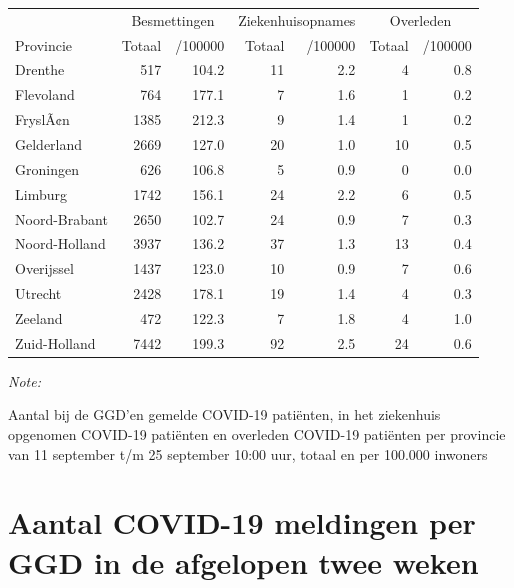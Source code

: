 \documentclass[
  english,
  man,floatsintext]{apa6}
\begin{document}
\begin{table}
\centering
\begin{threeparttable}
\begin{tabular}{lrrrrrr}
\toprule
\multicolumn{1}{c}{ } & \multicolumn{2}{c}{Besmettingen} & \multicolumn{2}{c}{Ziekenhuisopnames} & \multicolumn{2}{c}{Overleden} \\
\cmidrule(l{3pt}r{3pt}){2-3} \cmidrule(l{3pt}r{3pt}){4-5} \cmidrule(l{3pt}r{3pt}){6-7}
Provincie & Totaal & /100000 & Totaal & /100000 & Totaal & /100000\\
\midrule
Drenthe & 517 & 104.2 & 11 & 2.2 & 4 & 0.8\\
Flevoland & 764 & 177.1 & 7 & 1.6 & 1 & 0.2\\
FryslÃ¢n & 1385 & 212.3 & 9 & 1.4 & 1 & 0.2\\
Gelderland & 2669 & 127.0 & 20 & 1.0 & 10 & 0.5\\
Groningen & 626 & 106.8 & 5 & 0.9 & 0 & 0.0\\
Limburg & 1742 & 156.1 & 24 & 2.2 & 6 & 0.5\\
Noord-Brabant & 2650 & 102.7 & 24 & 0.9 & 7 & 0.3\\
Noord-Holland & 3937 & 136.2 & 37 & 1.3 & 13 & 0.4\\
Overijssel & 1437 & 123.0 & 10 & 0.9 & 7 & 0.6\\
Utrecht & 2428 & 178.1 & 19 & 1.4 & 4 & 0.3\\
Zeeland & 472 & 122.3 & 7 & 1.8 & 4 & 1.0\\
Zuid-Holland & 7442 & 199.3 & 92 & 2.5 & 24 & 0.6\\
\bottomrule
\end{tabular}
\begin{tablenotes}
\item \textit{Note: } 
\item Aantal bij de GGD’en gemelde COVID-19 patiënten, in het ziekenhuis opgenomen COVID-19 patiënten en overleden COVID-19 patiënten per provincie van 11 september t/m 25 september 10:00 uur, totaal en per 100.000 inwoners
\end{tablenotes}
\end{threeparttable}
\end{table}

\newpage

\hypertarget{aantal-covid-19-meldingen-per-ggd-in-de-afgelopen-twee-weken}{%
\section{Aantal COVID-19 meldingen per GGD in de afgelopen twee weken}\label{aantal-covid-19-meldingen-per-ggd-in-de-afgelopen-twee-weken}}
\end{document}
